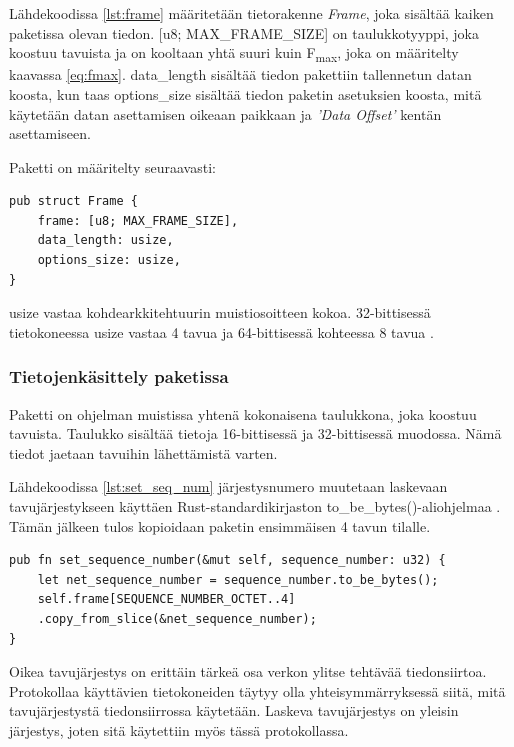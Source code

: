 \documentclass[a4paper,12pt]{article}
\begin{document}
    Lähdekoodissa \ref{lst:frame} määritetään tietorakenne \textit{Frame}, joka sisältää kaiken paketissa olevan tiedon.
    [u8; MAX\_FRAME\_SIZE]  on taulukkotyyppi, joka koostuu tavuista ja on kooltaan yhtä suuri kuin F\textsubscript{max}, joka on määritelty kaavassa \ref{eq:fmax}.
    data\_length sisältää tiedon pakettiin tallennetun datan koosta, kun taas options\_size sisältää tiedon paketin asetuksien koosta, mitä käytetään datan asettamisen oikeaan paikkaan ja \textit{'Data Offset'} kentän asettamiseen.
    
    Paketti on määritelty seuraavasti:
    \begin{lstlisting}[caption={Paketin rakenne}, label={lst:frame}]
pub struct Frame {
    frame: [u8; MAX_FRAME_SIZE],
    data_length: usize,
    options_size: usize,
}\end{lstlisting}
    
    usize vastaa kohdearkkitehtuurin muistiosoitteen kokoa. 32-bittisessä tietokoneessa usize vastaa 4 tavua ja 64-bittisessä kohteessa 8 tavua \cite[\textit{usize}]{rust-std}.
   
    \subsubsection*{Tietojenkäsittely paketissa}
    Paketti on ohjelman muistissa yhtenä kokonaisena taulukkona, joka koostuu tavuista.
    Taulukko sisältää tietoja 16-bittisessä ja 32-bittisessä muodossa. Nämä tiedot jaetaan tavuihin lähettämistä varten.

    Lähdekoodissa \ref{lst:set_seq_num} järjestysnumero muutetaan laskevaan tavujärjestykseen käyttäen Rust-standardikirjaston to\_be\_bytes()-aliohjelmaa \cite[\textit{u32}]{rust-std}. Tämän jälkeen tulos kopioidaan paketin ensimmäisen 4 tavun tilalle. \par
    
        \begin{lstlisting}[caption={Järjestysnumeron asettaminen pakettiin}, label={lst:set_seq_num}]
pub fn set_sequence_number(&mut self, sequence_number: u32) {
    let net_sequence_number = sequence_number.to_be_bytes();
    self.frame[SEQUENCE_NUMBER_OCTET..4]
    .copy_from_slice(&net_sequence_number);
}\end{lstlisting}


    Oikea tavujärjestys on erittäin tärkeä osa verkon ylitse tehtävää tiedonsiirtoa. Protokollaa käyttävien tietokoneiden täytyy olla yhteisymmärryksessä siitä, mitä tavujärjestystä tiedonsiirrossa käytetään. Laskeva tavujärjestys on yleisin järjestys, joten sitä käytettiin myös tässä protokollassa. \par
    
\end{document}
